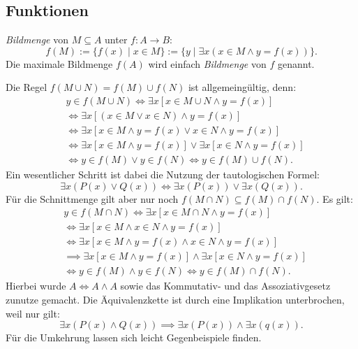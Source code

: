 \documentclass[a4paper,11pt,fleqn,twoside]{scrartcl}
\numberwithin{equation}{section}
\newcommand{\strong}[1]{{\normalfont\sffamily\bfseries #1}}
\newenvironment{Definition}{\par\noindent\strong{Definition.}}{\par}
\newcommand{\emdef}[1]{\emph{#1}}
\begin{document}
\subsection{Funktionen}
\begin{Definition}
\emph{Bildmenge} von $M\subseteq A$ unter $f\colon A\to B$:
\begin{equation}
f(M) := \{f(x)\mid x\in M\} := \{y\mid \exists x(x\in M\land y=f(x))\}.
\end{equation}
Die maximale Bildmenge $f(A)$ wird einfach \emdef{Bildmenge} von $f$ genannt.
\end{Definition}
Die Regel $f(M\cup N)=f(M)\cup f(N)$ ist allgemeingültig, denn:
\begin{align}
&y\in f(M\cup N) \iff \exists x[x\in M\cup N\land y=f(x)]\\
&\iff \exists x[(x\in M\lor x\in N)\land y=f(x)]\\
&\iff \exists x[x\in M\land y=f(x)\lor x\in N\land y=f(x)]\\
&\iff \exists x[x\in M\land y=f(x)]\lor\exists x[x\in N\land y=f(x)]\\
&\iff y\in f(M) \lor y\in f(N)
\iff y\in f(M)\cup f(N).
\end{align}
Ein wesentlicher Schritt ist dabei die Nutzung der tautologischen
Formel:
\begin{equation}
\exists x(P(x)\lor Q(x)) \iff \exists x(P(x))\lor\exists x(Q(x)).
\end{equation}
Für die Schnittmenge gilt aber nur noch
$f(M\cap N)\subseteq f(M)\cap f(N)$. Es gilt:
\begin{align}
& y\in f(M\cap N) \iff \exists x[x\in M\cap N\land y=f(x)]\\
& \iff \exists x[x\in M\land x\in N\land y=f(x)]\\
& \iff \exists x[x\in M\land y=f(x)\land x\in N\land y=f(x)]\\
& \implies \exists x[x\in M\land y=f(x)]\land\exists x[x\in N\land y=f(x)]\\
& \iff y\in f(M)\land y\in f(N)
\iff y\in f(M)\cap f(N).
\end{align}
Hierbei wurde $A\Leftrightarrow A\land A$ sowie das Kommutativ- und das
Assoziativgesetz zunutze gemacht. Die Äquivalenzkette ist durch
eine Implikation unterbrochen, weil nur gilt:
\begin{equation}
\exists x(P(x)\land Q(x)) \implies \exists x(P(x))\land\exists x(q(x)).
\end{equation}
Für die Umkehrung lassen sich leicht Gegenbeispiele finden.
\end{document}
